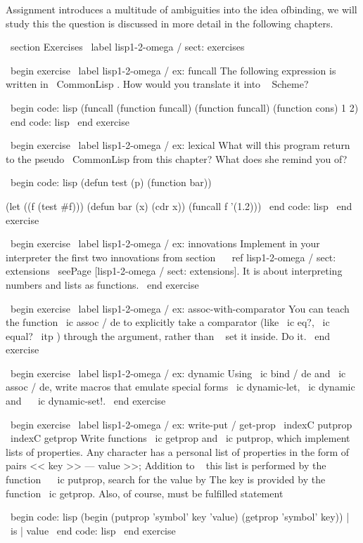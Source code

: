 {Assignment introduces a multitude of ambiguities into the idea of ​​binding, we will study this
the question is discussed in more detail in the following chapters.


\ section {Exercises} \ label {lisp1-2-omega / sect: exercises}

\ begin {exercise} \ label {lisp1-2-omega / ex: funcall}
The following expression is written in { \ CommonLisp }. How would you translate it into ~ Scheme?

\ begin {code: lisp}
(funcall (function funcall) (function funcall) (function cons) 1 2)
\ end {code: lisp}
\ end {exercise}

\ begin {exercise} \ label {lisp1-2-omega / ex: lexical}
What will this program return to the pseudo { \ CommonLisp } from this chapter?
What does she remind you of?

\ begin {code: lisp}
(defun test (p)
  (function bar))

(let ((f (test #f)))
  (defun bar (x) (cdr x))
  (funcall f '(1.2)))
\ end {code: lisp}
\ end {exercise}

\ begin {exercise} \ label {lisp1-2-omega / ex: innovations}
Implement in your interpreter the first two innovations from
section ~ \ ref {lisp1-2-omega / sect: extensions}
\ seePage [lisp1-2-omega / sect: extensions]. It is about interpreting numbers and
lists as functions.
\ end {exercise}

\ begin {exercise} \ label {lisp1-2-omega / ex: assoc-with-comparator}
You can teach the function \ ic {assoc / de} to explicitly take a comparator (like \ ic {eq?},
\ ic {equal?} { \ itp }) through the argument, rather than ~ set it inside. Do it.
\ end {exercise}

\ begin {exercise} \ label {lisp1-2-omega / ex: dynamic}
Using \ ic {bind / de} and \ ic {assoc / de}, write macros that emulate
special forms \ ic {dynamic-let}, \ ic {dynamic} and ~ \ ic {dynamic-set!}.
\ end {exercise}

\ begin {exercise} \ label {lisp1-2-omega / ex: write-put / get-prop}
\ indexC {putprop} \ indexC {getprop}
Write functions \ ic {getprop} and \ ic {putprop}, which implement lists of properties.
Any character has a personal list of properties in the form of pairs << key >> --- value >>;
Addition to ~ this list is performed by the function ~ \ ic {putprop}, search for the value by
The key is provided by the function \ ic {getprop}. Also, of course, must be fulfilled
statement

\ begin {code: lisp}
(begin (putprop 'symbol' key 'value)
       (getprop 'symbol' key)) | \ is | value
\ end {code: lisp}
\ end {exercise}

}
